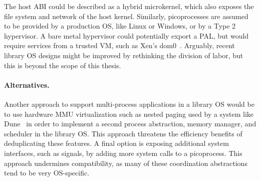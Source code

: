 
The \graphene{} host ABI could be described as a hybrid microkernel, which also exposes the file system and network of the host kernel.
Similarly, picoprocesses are assumed to be provided by a production OS, like Linux or Windows, or by a Type 2 hypervisor.  A bare metal hypervisor could potentially export a PAL, but would require services from a trusted VM, such as Xen's dom0~\cite{barham03xen}.
Arguably, recent library OS designs might be improved by rethinking the division of labor, but this is beyond the scope of this thesis.

\paragraph{Alternatives.}
Another approach to support multi-process applications in a library OS would be to use hardware MMU virtualization such as nested paging used by a system like Dune~\cite{belay12dune}
in order to implement a second process abstraction, memory manager, and scheduler in the library OS.
This approach threatens the efficiency benefits of deduplicating these features.
A final option is exposing additional system interfaces, such as signals, by adding more system calls to a picoprocess. This approach undermines compatibility, as many of these coordination abstractions tend to be very OS-specific.




